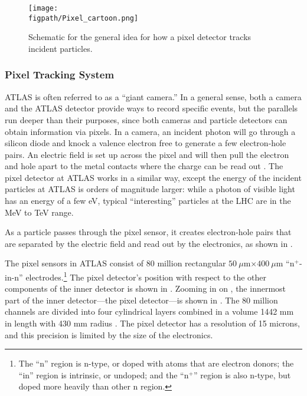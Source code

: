 \clearpage
\begin{wrapfigure}{r}{0.45\textwidth}
\centering
\texttt{[image: \\figpath/Pixel\_cartoon.png]}
\caption{Schematic for the general idea for how a pixel detector tracks incident particles.
~\cite{Quantum_diaries}}
\label{Pixel-cartoon}
\end{wrapfigure}

\subsubsection{Pixel Tracking System}

ATLAS is often referred to as a ``giant camera.''  
In a general sense, both a camera and the ATLAS detector provide ways to record specific events, but the parallels run deeper than their purposes, since both cameras and particle detectors can obtain information via pixels.  In a camera, an incident photon will go through a silicon diode and knock a valence electron free to generate a few electron-hole pairs.  An electric field is set up across the pixel and will then pull the electron and hole apart to the metal contacts where the charge can be read out \cite{Quantum_diaries}.  The pixel detector at ATLAS works in a similar way, except the energy of the incident particles at ATLAS is orders of magnitude larger: while a photon of visible light has an energy of a few eV, typical ``interesting'' particles at the LHC are in the MeV to TeV range.  

As a particle passes through the pixel sensor, it creates electron-hole pairs that are separated by the electric field and read out by the electronics, as shown in . 

The pixel sensors in ATLAS consist of 80 million \cite{Detector_challenges} rectangular $50~\mu$m$ \times 400~\mu$m ``n$^+$-in-n'' electrodes.\footnote{The ``n'' region is n-type, or  doped with atoms that are electron donors; the ``in'' region is intrinsic, or undoped; and the ``n$^+$'' region is also n-type, but doped more heavily than other n region.}
The pixel detector's position with respect to the other components of the inner detector is shown in . 
Zooming in on  , the innermost part of the inner detector---the pixel detector---is shown in .  The 80 million channels are divided into four cylindrical layers combined in a volume 1442 mm in length with 430 mm radius \cite{Aad:2008Jinst}. The pixel detector has a resolution of 15 microns, and this precision is limited by the size of the electronics.


